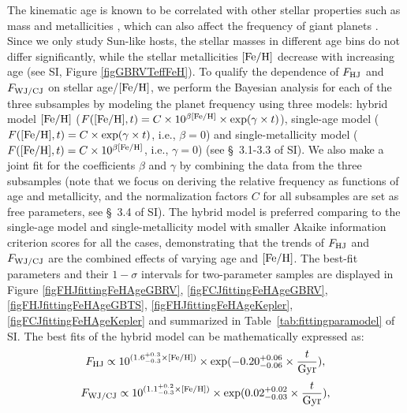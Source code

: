 \documentclass[twocolumn]{pnas-new}
\begin{document}
The kinematic age is known to be correlated with other stellar properties such as mass and metallicities \citep[e.g.,][]{2014A&A...562A..71B,2021AJ....162..100C}, which can also affect the frequency of giant planets \citep[e.g.][]{2010PASP..122..905J,2017ApJ...838...25G,2022arXiv221008313G}.
Since we only study Sun-like hosts, the stellar masses in different age bins do not differ significantly, while the stellar metallicities $\rm 
 [Fe/H]$ decrease with increasing age (see SI, Figure \ref{figGBRVTeffFeH}). 
 To qualify the dependence of $F_{\rm HJ}$ and $F_{\rm WJ/CJ}$ on stellar age/$\rm [Fe/H]$, we perform the Bayesian analysis for each of the three subsamples by modeling the planet frequency using three models: hybrid model $\rm [Fe/H]$ ($F({\rm [Fe/H]}, t) = C \times 10^{\beta \rm [Fe/H]} \times {\rm exp}(\gamma \times t)$), single-age model ($F({\rm [Fe/H]}, t) = C \times {\rm exp}(\gamma \times t)$, i.e., $\beta = 0$) and single-metallicity model ($F({\rm [Fe/H]}, t) = C \times 10^{\beta \rm [Fe/H]}$, i.e., $\gamma = 0$) (see \S~3.1-3.3 of SI). 
 We also make a joint fit for the coefficients $\beta$ and $\gamma$ by combining the data from the three subsamples (note that we focus on deriving the relative frequency as functions of age and metallicity, and the normalization factors $C$ for all subsamples are set as free parameters, see \S~3.4 of SI).
 The hybrid model is preferred comparing to the single-age model and single-metallicity model with smaller Akaike information criterion  \citep[AIC;][]{CAVANAUGH1997201} scores for all the cases, demonstrating that the trends of $F_{\rm HJ}$ and $F_{\rm WJ/CJ}$ are the combined effects of varying age and $\rm [Fe/H]$.
The best-fit parameters and their $1-\sigma$ intervals for two-parameter samples are displayed in Figure \ref{figFHJfittingFeHAgeGBRV}, \ref{figFCJfittingFeHAgeGBRV}, \ref{figFHJfittingFeHAgeGBTS}, \ref{figFHJfittingFeHAgeKepler}, \ref{figFCJfittingFeHAgeKepler} and summarized in Table~\ref{tab:fittingparamodel} of SI.
The best fits of the hybrid model can be mathematically expressed as:
{
\begin{eqnarray}
{F_{\rm HJ}} \propto 10^{(1.6^{+0.3}_{-0.3} \times \rm [Fe/H])} \times {\rm exp}(-0.20^{+0.06}_{-0.06} \times \frac{t}{\rm Gyr}),
\end{eqnarray}
\begin{eqnarray}
{F_{\rm WJ/CJ}} \propto 10^{(1.1^{+0.2}_{-0.3} \times \rm [Fe/H])} \times {\rm exp}(0.02^{+0.02}_{-0.03} \times \frac{t}{\rm Gyr}),
\end{eqnarray}}
\end{document}
